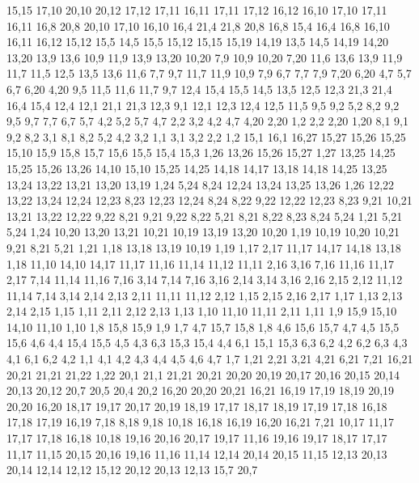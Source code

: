 15,15
%
17,10
20,10
20,12
17,12
17,11
%
16,11
17,11
17,12
16,12
%
16,10
17,10
17,11
16,11
%
16,8
20,8
20,10
17,10
16,10
%
16,4
21,4
21,8
20,8
16,8
%
15,4
16,4
16,8
16,10
16,11
16,12
15,12
15,5
%
14,5
15,5
15,12
15,15
15,19
14,19
%
13,5
14,5
14,19
14,20
13,20
13,9
13,6
%
10,9
11,9
13,9
13,20
10,20
%
7,9
10,9
10,20
7,20
%
11,6
13,6
13,9
11,9
11,7
%
11,5
12,5
13,5
13,6
11,6
%
7,7
9,7
11,7
11,9
10,9
7,9
%
6,7
7,7
7,9
7,20
6,20
%
4,7
5,7
6,7
6,20
4,20
%
9,5
11,5
11,6
11,7
9,7
%
12,4
15,4
15,5
14,5
13,5
12,5
%
12,3
21,3
21,4
16,4
15,4
12,4
%
12,1
21,1
21,3
12,3
%
9,1
12,1
12,3
12,4
12,5
11,5
9,5
9,2
%
5,2
8,2
9,2
9,5
9,7
7,7
6,7
5,7
%
4,2
5,2
5,7
4,7
%
2,2
3,2
4,2
4,7
4,20
2,20
%
1,2
2,2
2,20
1,20
%
8,1
9,1
9,2
8,2
%
3,1
8,1
8,2
5,2
4,2
3,2
%
1,1
3,1
3,2
2,2
1,2
15,1
16,1
16,27
15,27
15,26
15,25
15,10
15,9
15,8
15,7
15,6
15,5
15,4
15,3
%
1,26
13,26
15,26
15,27
1,27
%
13,25
14,25
15,25
15,26
13,26
%
14,10
15,10
15,25
14,25
14,18
14,17
%
13,18
14,18
14,25
13,25
13,24
13,22
13,21
13,20
13,19
%
1,24
5,24
8,24
12,24
13,24
13,25
13,26
1,26
%
12,22
13,22
13,24
12,24
12,23
%
8,23
12,23
12,24
8,24
%
8,22
9,22
12,22
12,23
8,23
%
9,21
10,21
13,21
13,22
12,22
9,22
%
8,21
9,21
9,22
8,22
%
5,21
8,21
8,22
8,23
8,24
5,24
%
1,21
5,21
5,24
1,24
%
10,20
13,20
13,21
10,21
%
10,19
13,19
13,20
10,20
%
1,19
10,19
10,20
10,21
9,21
8,21
5,21
1,21
%
1,18
13,18
13,19
10,19
1,19
%
1,17
2,17
11,17
14,17
14,18
13,18
1,18
%
11,10
14,10
14,17
11,17
11,16
11,14
11,12
11,11
%
2,16
3,16
7,16
11,16
11,17
2,17
%
7,14
11,14
11,16
7,16
%
3,14
7,14
7,16
3,16
%
2,14
3,14
3,16
2,16
2,15
%
2,12
11,12
11,14
7,14
3,14
2,14
2,13
%
2,11
11,11
11,12
2,12
%
1,15
2,15
2,16
2,17
1,17
%
1,13
2,13
2,14
2,15
1,15
%
1,11
2,11
2,12
2,13
1,13
%
1,10
11,10
11,11
2,11
1,11
%
1,9
15,9
15,10
14,10
11,10
1,10
%
1,8
15,8
15,9
1,9
%
1,7
4,7
15,7
15,8
1,8
%
4,6
15,6
15,7
4,7
%
4,5
15,5
15,6
4,6
%
4,4
15,4
15,5
4,5
%
4,3
6,3
15,3
15,4
4,4
%
6,1
15,1
15,3
6,3
6,2
%
4,2
6,2
6,3
4,3
%
4,1
6,1
6,2
4,2
%
1,1
4,1
4,2
4,3
4,4
4,5
4,6
4,7
1,7
1,21
2,21
3,21
4,21
6,21
7,21
16,21
20,21
21,21
21,22
1,22
%
20,1
21,1
21,21
20,21
20,20
20,19
20,17
20,16
20,15
20,14
20,13
20,12
20,7
20,5
20,4
20,2
%
16,20
20,20
20,21
16,21
%
16,19
17,19
18,19
20,19
20,20
16,20
%
18,17
19,17
20,17
20,19
18,19
%
17,17
18,17
18,19
17,19
17,18
%
16,18
17,18
17,19
16,19
%
7,18
8,18
9,18
10,18
16,18
16,19
16,20
16,21
7,21
%
10,17
11,17
17,17
17,18
16,18
10,18
%
19,16
20,16
20,17
19,17
%
11,16
19,16
19,17
18,17
17,17
11,17
%
11,15
20,15
20,16
19,16
11,16
%
11,14
12,14
20,14
20,15
11,15
%
12,13
20,13
20,14
12,14
%
12,12
15,12
20,12
20,13
12,13
%
15,7
20,7
